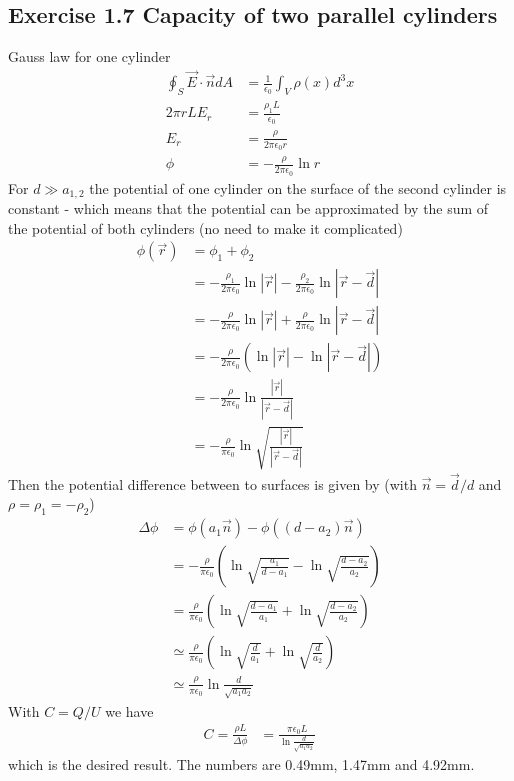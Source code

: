 \documentclass[../main.tex]{subfiles}
\begin{document}
\subsection{Exercise 1.7 Capacity of two parallel cylinders}Gauss law for one cylinder
\begin{align}
\oint_S\vec{E}\cdot\vec{n}dA&=\frac{1}{\epsilon_0}\int_V\rho(x)d^3x\\
2\pi rLE_r&=\frac{\rho_{1} L}{\epsilon_0}\\
E_r&=\frac{\rho}{2\pi\epsilon_0r}\\
\phi&=-\frac{\rho}{2\pi\epsilon_0}\ln r
\end{align}
For $d\gg a_{1,2}$ the potential of one cylinder on the surface of the second cylinder is constant - which means that the potential can be approximated by the sum of the potential of both cylinders (no need to make it complicated)
\begin{align}
\phi(\vec{r})&=\phi_1+\phi_2\\
&=-\frac{\rho_{1}}{2\pi\epsilon_0}\ln |\vec{r}|-\frac{\rho_{2}}{2\pi\epsilon_0}\ln |\vec{r}-\vec{d}|\\
&=-\frac{\rho}{2\pi\epsilon_0}\ln |\vec{r}|+\frac{\rho}{2\pi\epsilon_0}\ln |\vec{r}-\vec{d}|\\
&=-\frac{\rho}{2\pi\epsilon_0}\left(\ln |\vec{r}|-\ln |\vec{r}-\vec{d}|\right)\\
&=-\frac{\rho}{2\pi\epsilon_0}\ln \frac{|\vec{r}|}{|\vec{r}-\vec{d}|}\\
&=-\frac{\rho}{\pi\epsilon_0}\ln \sqrt{\frac{|\vec{r}|}{|\vec{r}-\vec{d}|}}
\end{align}
Then the potential difference between to surfaces is given by (with $\vec{n}=\vec{d}/d$ and $\rho=\rho_1=-\rho_2$)
\begin{align}
\Delta\phi&=\phi(a_1\vec{n})-\phi((d-a_2)\vec{n})\\
&=-\frac{\rho}{\pi\epsilon_0}\left(\ln \sqrt{\frac{a_1}{d-a_1}}-\ln \sqrt{\frac{d-a_2}{a_2}}\right)\\
&=\frac{\rho}{\pi\epsilon_0}\left(\ln \sqrt{\frac{d-a_1}{a_1}}+\ln \sqrt{\frac{d-a_2}{a_2}}\right)\\
&\simeq\frac{\rho}{\pi\epsilon_0}\left(\ln \sqrt{\frac{d}{a_1}}+\ln \sqrt{\frac{d}{a_2}}\right)\\
&\simeq\frac{\rho}{\pi\epsilon_0}\ln \frac{d}{\sqrt{a_1a_2}}
\end{align}
With $C=Q/U$ we have
\begin{align}
C=\frac{\rho L}{\Delta\phi}&=\frac{\pi\epsilon_0L}{\ln \frac{d}{\sqrt{a_1a_2}}}
\end{align}
which is the desired result. The numbers are 0.49mm, 1.47mm and 4.92mm.
\end{document}
